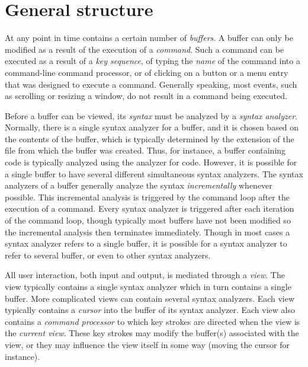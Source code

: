 \chapter{General structure}
\label{chap-general-structure}

At any point in time \sysname{} contains a certain number of
\emph{buffers}.  A buffer can only be modified as a result of the
execution of a \emph{command}.  Such a command can be executed as a
result of a \emph{key sequence}, of typing the \emph{name} of the
command into a command-line command processor, or of clicking on a
button or a menu entry that was designed to execute a command.
Generally speaking, most events, such as scrolling or resizing a
window, do not result in a command being executed. 

Before a buffer can be viewed, its \emph{syntax} must be analyzed by a
\emph{syntax analyzer}.  Normally, there is a single syntax analyzer
for a buffer, and it is chosen based on the contents of the buffer,
which is typically determined by the extension of the file from which
the buffer was created.  Thus, for instance, a buffer containing
\commonlisp{} code is typically analyzed using the analyzer for
\commonlisp{} code.  However, it is possible for a single buffer to
have several different simultaneous syntax analyzers.  The syntax
analyzers of a buffer generally analyze the syntax
\emph{incrementally} whenever possible.  This incremental analysis is
triggered by the command loop after the execution of a command.  Every
syntax analyzer is triggered after each iteration of the command loop,
though typically most buffers have not been modified so the
incremental analysis then terminates immediately.  Though in most
cases a syntax analyzer refers to a single buffer, it is possible for
a syntax analyzer to refer to several buffer, or even to other syntax
analyzers.

All user interaction, both input and output, is mediated through a
\emph{view}.  The view typically contains a single syntax analyzer
which in turn contains a single buffer.  More complicated views can
contain several syntax analyzers.  Each view typically contains a
\emph{cursor} into the buffer of its syntax analyzer.  Each view also
contains a \emph{command processor} to which key strokes are directed
when the view is the \emph{current view}.  These key strokes may
modify the buffer(s) associated with the view, or they may influence
the view itself in some way (moving the cursor for instance).

